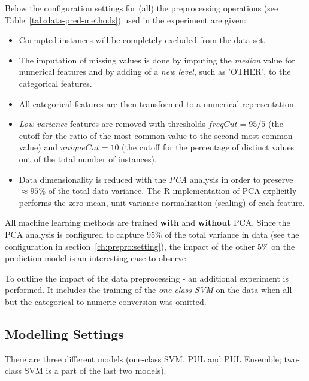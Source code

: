 Below the configuration settings for (all) the preprocessing operations (see Table~\ref{tab:data-pred-methods}) used in the experiment are given:

\begin{itemize}
    \item Corrupted instances will be completely excluded from the data set.
    
    \item The imputation of missing values is done by imputing the \textit{median} value for numerical features and by adding of a \textit{new level}, such as 'OTHER', to the categorical features.
    
    \item All categorical features are then transformed to a numerical representation.
    
    \item \textit{Low variance} features are removed with thresholds \(freqCut = 95/5\) (the cutoff for the ratio of the most common value to the second most common value) and \(uniqueCut = 10\) (the cutoff for the percentage of distinct values out of the total number of instances). 
    
    \item Data dimensionality is reduced with the \textit{PCA} analysis in order to preserve \(\approx95\%\) of the total data variance. The R implementation of PCA explicitly performs the zero-mean, unit-variance normalization (scaling) of each feature.
    
\end{itemize}

All machine learning methods are trained \textbf{with} and \textbf{without} PCA. Since the PCA analysis is configured to capture \(95\%\) of the total variance in data (see the configuration in section~\ref{ch:prepro:setting}), the impact of the other \(5\%\) on the prediction model is an interesting case to observe.

To outline the impact of the data preprocessing - an additional experiment is performed. It includes the training of the \textit{one-class SVM} on the data when all but the categorical-to-numeric conversion was omitted.

\subsection{Modelling Settings}\label{ch:modelling-settings}

There are three different models (one-class SVM, PUL and PUL Ensemble; two-class SVM is a part of the last two models).

